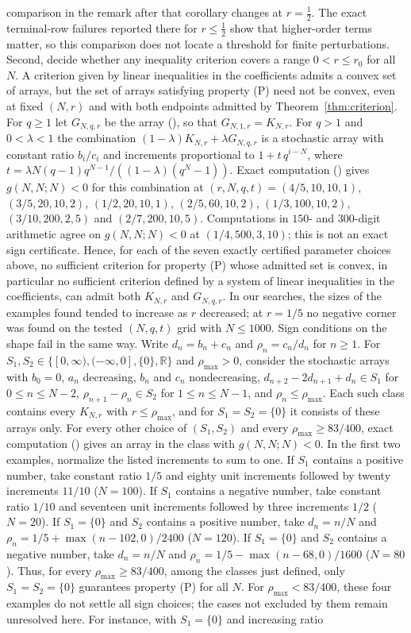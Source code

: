 \documentclass[twoside,10pt]{article}
\numberwithin{equation}{section}
\theoremstyle{slbody}
\theoremstyle{definition}
\theoremstyle{remark}
\renewcommand{\eqref}[1]{\textup{{\normalfont(\oldstylenums{\ref{#1}}}\normalfont)}}
\begin{document}
comparison in the remark after that corollary changes at $r=\tfrac12$. The exact terminal-row failures reported there for $r\leq\tfrac12$ show that higher-order terms matter, so this comparison does not locate a threshold for finite perturbations. Second, decide whether any inequality criterion covers a range $0<r\leq r_0$ for all $N$. A criterion given by linear inequalities in the coefficients admits a convex set of arrays, but the set of arrays satisfying property (P) need not be convex, even at fixed $(N,r)$ and with both endpoints admitted by Theorem~\ref{thm:criterion}. For $q\geq1$ let $G_{N,q,r}$ be the array \eqref{eq:parameters}, so that $G_{N,1,r}=K_{N,r}$. For $q>1$ and $0<\lambda<1$ the combination $(1-\lambda)K_{N,r}+\lambda G_{N,q,r}$ is a stochastic array with constant ratio $b_i/c_i$ and increments proportional to $1+t\,q^{i-N}$, where $t=\lambda N(q-1)q^{N-1}/((1-\lambda)(q^N-1))$. Exact computation () gives $g(N,N;N)<0$ for this combination at $(r,N,q,t)=(4/5,10,10,1)$, $(3/5,20,10,2)$, $(1/2,20,10,1)$, $(2/5,60,10,2)$, $(1/3,100,10,2)$, $(3/10,200,2,5)$ and $(2/7,200,10,5)$. Computations in $150$- and $300$-digit arithmetic agree on $g(N,N;N)<0$ at $(1/4,500,3,10)$; this is not an exact sign certificate. Hence, for each of the seven exactly certified parameter choices above, no sufficient criterion for property (P) whose admitted set is convex, in particular no sufficient criterion defined by a system of linear inequalities in the coefficients, can admit both $K_{N,r}$ and $G_{N,q,r}$. In our searches, the sizes of the examples found tended to increase as $r$ decreased; at $r=1/5$ no negative corner was found on the tested $(N,q,t)$ grid with $N\leq1000$. Sign conditions on the shape fail in the same way. Write $d_n=b_n+c_n$ and $\rho_n=c_n/d_n$ for $n\geq1$. For $S_1,S_2\in\{[0,\infty),(-\infty,0],\{0\},\mathbb R\}$ and $\rho_{\max}>0$, consider the stochastic arrays with $b_0=0$, $a_n$ decreasing, $b_n$ and $c_n$ nondecreasing, $d_{n+2}-2d_{n+1}+d_n\in S_1$ for $0\leq n\leq N-2$, $\rho_{n+1}-\rho_n\in S_2$ for $1\leq n\leq N-1$, and $\rho_n\leq\rho_{\max}$. Each such class contains every $K_{N,r}$ with $r\leq\rho_{\max}$, and for $S_1=S_2=\{0\}$ it consists of these arrays only. For every other choice of $(S_1,S_2)$ and every $\rho_{\max}\geq83/400$, exact computation () gives an array in the class with $g(N,N;N)<0$. In the first two examples, normalize the listed increments to sum to one. If $S_1$ contains a positive number, take constant ratio $1/5$ and eighty unit increments followed by twenty increments $11/10$ ($N=100$). If $S_1$ contains a negative number, take constant ratio $1/10$ and seventeen unit increments followed by three increments $1/2$ ($N=20$). If $S_1=\{0\}$ and $S_2$ contains a positive number, take $d_n=n/N$ and $\rho_n=1/5+\max(n-102,0)/2400$ ($N=120$). If $S_1=\{0\}$ and $S_2$ contains a negative number, take $d_n=n/N$ and $\rho_n=1/5-\max(n-68,0)/1600$ ($N=80$). Thus, for every $\rho_{\max}\geq83/400$, among the classes just defined, only $S_1=S_2=\{0\}$ guarantees property (P) for all $N$. For $\rho_{\max}<83/400$, these four examples do not settle all sign choices; the cases not excluded by them remain unresolved here. For instance, with $S_1=\{0\}$ and increasing ratio 
\end{document}
